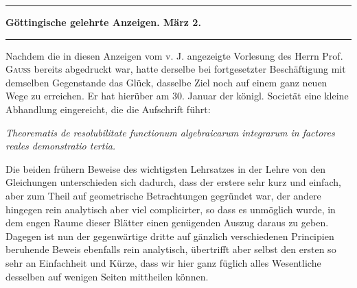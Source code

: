 \clearpage{}
\begin{center}
\rule{0.45\linewidth}{0.4pt}\par
\textbf{Göttingische gelehrte Anzeigen. März 2.}\par
\rule{0.45\linewidth}{0.4pt}
\end{center}

Nachdem die in diesen Anzeigen vom v. J. angezeigte Vorlesung des
Herrn Prof. \textsc{Gauss} bereits abgedruckt war, hatte derselbe bei
fortgesetzter Beschäftigung mit demselben Gegenstande das Glück,
dasselbe Ziel noch auf einem ganz neuen Wege zu erreichen. Er hat
hierüber am 30. Januar der königl. Societät eine kleine Abhandlung
eingereicht, die die Aufschrift führt:

\begin{center}
\emph{Theorematis de resolubilitate functionum algebraicarum integrarum
in factores reales demonstratio tertia.}
\end{center}

Die beiden frühern Beweise des wichtigsten Lehrsatzes in der Lehre
von den Gleichungen unterschieden sich dadurch, dass der erstere sehr
kurz und einfach, aber zum Theil auf geometrische Betrachtungen
gegründet war, der andere hingegen rein analytisch aber viel
complicirter, so dass es unmöglich wurde, in dem engen Raume dieser
Blätter einen genügenden Auszug daraus zu geben. Dagegen ist nun der
gegenwärtige dritte auf gänzlich verschiedenen Principien beruhende
Beweis ebenfalls rein analytisch, übertrifft aber selbst den ersten
so sehr an Einfachheit und Kürze, dass wir hier ganz füglich alles
Wesentliche desselben auf wenigen Seiten mittheilen können.

